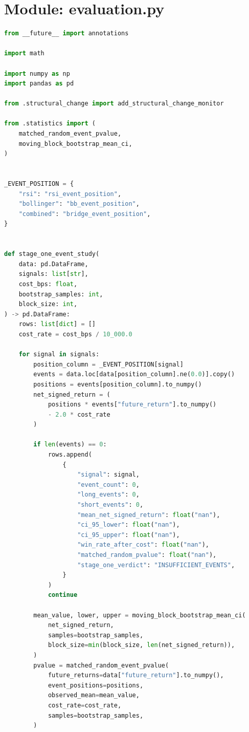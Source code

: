 \documentclass[11pt,a4paper]{report}
\begin{document}
\section{Module: evaluation.py}
\begin{lstlisting}[language=Python]
from __future__ import annotations

import math

import numpy as np
import pandas as pd

from .structural_change import add_structural_change_monitor

from .statistics import (
    matched_random_event_pvalue,
    moving_block_bootstrap_mean_ci,
)


_EVENT_POSITION = {
    "rsi": "rsi_event_position",
    "bollinger": "bb_event_position",
    "combined": "bridge_event_position",
}


def stage_one_event_study(
    data: pd.DataFrame,
    signals: list[str],
    cost_bps: float,
    bootstrap_samples: int,
    block_size: int,
) -> pd.DataFrame:
    rows: list[dict] = []
    cost_rate = cost_bps / 10_000.0

    for signal in signals:
        position_column = _EVENT_POSITION[signal]
        events = data.loc[data[position_column].ne(0.0)].copy()
        positions = events[position_column].to_numpy()
        net_signed_return = (
            positions * events["future_return"].to_numpy()
            - 2.0 * cost_rate
        )

        if len(events) == 0:
            rows.append(
                {
                    "signal": signal,
                    "event_count": 0,
                    "long_events": 0,
                    "short_events": 0,
                    "mean_net_signed_return": float("nan"),
                    "ci_95_lower": float("nan"),
                    "ci_95_upper": float("nan"),
                    "win_rate_after_cost": float("nan"),
                    "matched_random_pvalue": float("nan"),
                    "stage_one_verdict": "INSUFFICIENT_EVENTS",
                }
            )
            continue

        mean_value, lower, upper = moving_block_bootstrap_mean_ci(
            net_signed_return,
            samples=bootstrap_samples,
            block_size=min(block_size, len(net_signed_return)),
        )
        pvalue = matched_random_event_pvalue(
            future_returns=data["future_return"].to_numpy(),
            event_positions=positions,
            observed_mean=mean_value,
            cost_rate=cost_rate,
            samples=bootstrap_samples,
        )


\end{lstlisting}
\end{document}
